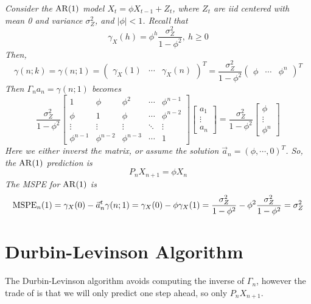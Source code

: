 \begin{example}[AR(1)]
    \emph{
        Consider the $\operatorname{AR}(1)$ model $X_t = \phi X_{t-1} + Z_t$, where $Z_t$ are iid centered with mean 0 and variance $\sigma_Z^2$, and $|\phi| < 1$. Recall that 
        \[\gamma_X(h) = \phi^h\frac{\sigma_Z^2}{1-\phi^2}, \ h \geq 0\]
        Then, 
        \[\gamma(n;k) = \gamma(n;1) = \begin{pmatrix}
            \gamma_X(1) & \cdots & \gamma_X(n)
        \end{pmatrix}^T = \frac{\sigma_Z^2}{1-\phi^2}\begin{pmatrix}
            \phi & \cdots & \phi^n
        \end{pmatrix}^T\]
        Then $\Gamma_n a_n = \gamma(n;1)$ becomes
        \[\frac{\sigma_Z^2}{1-\phi^2}\begin{bmatrix}
            1 & \phi & \phi^2 & \cdots & \phi^{n-1}\\
            \phi & 1 & \phi & \cdots & \phi^{n-2}\\
            \vdots & \vdots & \vdots & \ddots & \vdots \\
            \phi^{n-1} & \phi^{n-2} & \phi^{n-3} & \cdots & 1
        \end{bmatrix}\begin{bmatrix}
            a_1\\ \vdots \\ a_n
        \end{bmatrix} = \frac{\sigma_Z^2}{1-\phi^2}\begin{bmatrix}
            \phi \\ \vdots \\ \phi^n
        \end{bmatrix}\]
        Here we either inverst the matrix, or assume the solution $\vec{a}_n =(\phi, \cdots, 0)^T$. So, the $\operatorname{AR}(1)$ prediction is 
        \[P_nX_{n+1} = \phi X_n\]
        The MSPE for $\operatorname{AR}(1)$ is 
        \[\operatorname{MSPE}_n(1) = \gamma_X(0) - \vec{a}_n^t\gamma(n;1) = \gamma_X(0) - \phi\gamma_X(1) = \frac{\sigma_Z^2}{1-\phi^2} - \phi^2\frac{\sigma_Z^2}{1-\phi^2} = \sigma_Z^2\]
        }
\end{example}

\section{Durbin-Levinson Algorithm}

The Durbin-Levinson algorithm avoids computing the inverse of $\Gamma_n$, however the trade of is that we will only predict one step ahead, so only $P_nX_{n+1}$.\\

